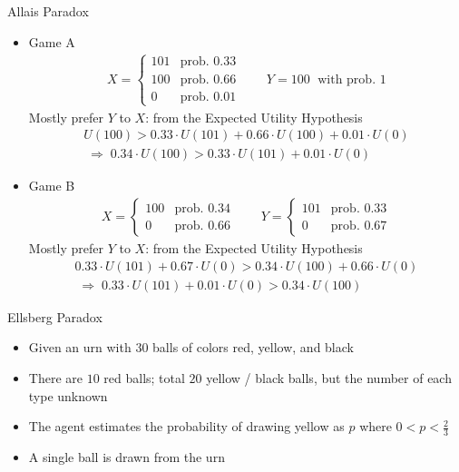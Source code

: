 \documentclass[10pt]{beamer}
\newcommand{\ie}{\;\Longrightarrow\;}
\begin{document}
\begin{frame}{Allais Paradox}
  \begin{itemize}[<+->]\setlength\itemsep{0em}
    \item Game A
      \begin{align*}
        X = \begin{cases}101 & \text{prob. } 0.33\\100 & \text{prob. } 0.66\\ 0 & \text{prob. } 0.01 \end{cases} \qquad
        Y = 100 \;\text{ with prob. } 1
      \end{align*}
      \onslide<+->
      Mostly prefer $Y$ to $X$: from the Expected Utility Hypothesis 
      \onslide<+->
      \begin{multline}
        U(100) > 0.33\cdot U(101) + 0.66\cdot U(100) + 0.01\cdot U(0)\\ \ie 0.34\cdot U(100) > 0.33\cdot U(101) + 0.01\cdot U(0)
      \end{multline}
    \item Game B 
      \begin{align*}
        X = \begin{cases}100 & \text{prob. } 0.34\\ 0 & \text{prob. } 0.66 \end{cases} \qquad
        Y = \begin{cases}101 & \text{prob. } 0.33\\ 0 & \text{prob. } 0.67 \end{cases}
      \end{align*}
      \onslide<+->
      Mostly prefer $Y$ to $X$: from the Expected Utility Hypothesis 
      \onslide<+->
      \begin{multline}
        0.33\cdot U(101) + 0.67\cdot U(0) > 0.34\cdot U(100) + 0.66\cdot U(0)\\ \ie 0.33\cdot U(101) + 0.01\cdot U(0) > 0.34\cdot U(100)
      \end{multline}
  \end{itemize}
\end{frame}

\begin{frame}{Ellsberg Paradox}
  \begin{itemize}[<+->]
    \item Given an urn with $30$ balls of colors red, yellow, and black
    \item There are $10$ red balls; total $20$ yellow / black balls, but the number of each type unknown
    \item The agent estimates the probability of drawing yellow as $p$ where $0 < p < \frac{2}{3}$
    \item A single ball is drawn from the urn
  \end{itemize}
\end{frame}
\end{document}
